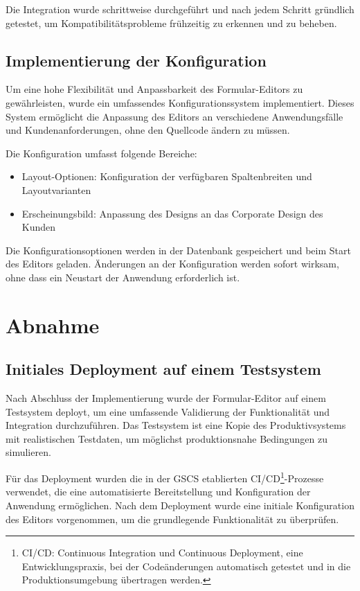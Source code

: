 \documentclass[a4paper,11pt]{article}
\begin{document}
\noindent Die Integration wurde schrittweise durchgeführt und nach jedem Schritt gründlich getestet, um Kompatibilitätsprobleme frühzeitig zu erkennen und zu beheben.

\subsection{Implementierung der Konfiguration}
Um eine hohe Flexibilität und Anpassbarkeit des Formular-Editors zu gewährleisten, wurde ein umfassendes Konfigurationssystem implementiert. Dieses System ermöglicht die Anpassung des Editors an verschiedene Anwendungsfälle und Kundenanforderungen, ohne den Quellcode ändern zu müssen.

\noindent Die Konfiguration umfasst folgende Bereiche:
\begin{itemize}
  \item Layout-Optionen: Konfiguration der verfügbaren Spaltenbreiten und Layoutvarianten
  \item Erscheinungsbild: Anpassung des Designs an das Corporate Design des Kunden
\end{itemize}

\noindent Die Konfigurationsoptionen werden in der Datenbank gespeichert und beim Start des Editors geladen. Änderungen an der Konfiguration werden sofort wirksam, ohne dass ein Neustart der Anwendung erforderlich ist.

\section{Abnahme}
\subsection{Initiales Deployment auf einem Testsystem}
Nach Abschluss der Implementierung wurde der Formular-Editor auf einem Testsystem deployt, um eine umfassende Validierung der Funktionalität und Integration durchzuführen. Das Testsystem ist eine Kopie des Produktivsystems mit realistischen Testdaten, um möglichst produktionsnahe Bedingungen zu simulieren.

\noindent Für das Deployment wurden die in der GSCS etablierten CI/CD\footnote{CI/CD: Continuous Integration und Continuous Deployment, eine Entwicklungspraxis, bei der Codeänderungen automatisch getestet und in die Produktionsumgebung übertragen werden.}-Prozesse verwendet, die eine automatisierte Bereitstellung und Konfiguration der Anwendung ermöglichen. Nach dem Deployment wurde eine initiale Konfiguration des Editors vorgenommen, um die grundlegende Funktionalität zu überprüfen.
\end{document}
